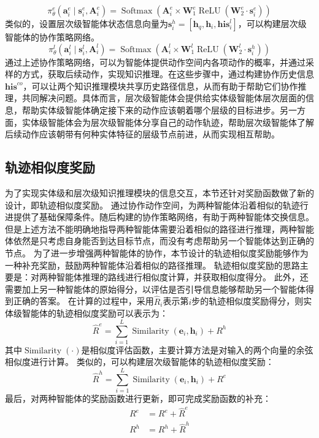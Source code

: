 \documentclass[algorithmlist, AutoFakeBold, AutoFakeSlant, figurelist, tablelist, nomlist, engineering]{seuthesix}
\begin{document}
\begin{equation}
  \pi_\theta^e\left(\bm{a}_i^e \mid \bm{s}_i^e, \bm{A}_i^e\right) =\operatorname{Softmax}\left(\bm{A}_i^e \times \mathbf{W}_1^e \operatorname{ReLU}\left(\mathbf{W}_2^e \cdot \bm{s}_i^{e}\right)\right)
  \label{pi_1}
\end{equation}
类似的，设置层次级智能体状态信息向量为$\bm{s}_i^{h} = \left[\bm{h}_q, \bm{h}_i, \bm{his}_i^l\right]$，可以构建层次级智能体的协作策略网络。
\begin{equation}
  \pi_\theta^l\left(\bm{a}_i^l \mid \bm{s}_i^l, \bm{A}_i^l\right) =\operatorname{Softmax}\left(\bm{A}_i^l \times \mathbf{W}_1^l \operatorname{ReLU}\left(\mathbf{W}_2^l \cdot \bm{s}_i^{h}\right)\right)
  \label{pi_2}
\end{equation}
通过上述协作策略网络，可以为智能体提供动作空间内各项动作的概率，并通过采样的方式，获取后续动作，实现知识推理。在这些步骤中，通过构建协作历史信息$\bm{his}^{co}$，可以让两个知识推理模块共享历史路径信息，从而有助于帮助它们协作推理，共同解决问题。具体而言，层次级智能体会提供给实体级智能体层次层面的信息，帮助实体级智能体确定接下来的动作应该朝着哪个层级的目标进步。另一方面，实体级智能体会为层次级智能体分享自己的动作轨迹，帮助层次级智能体了解后续动作应该朝带有何种实体特征的层级节点前进，从而实现相互帮助。

\subsection{轨迹相似度奖励}
为了实现实体级和层次级知识推理模块的信息交互，本节还针对奖励函数做了新的设计，即轨迹相似度奖励。
通过协作动作空间，为两种智能体沿着相似的轨迹行进提供了基础保障条件。随后构建的协作策略网络，有助于两种智能体交换信息。
但是上述方法不能明确地指导两种智能体需要沿着相似的路径进行推理，两种智能体依然是只考虑自身能否到达目标节点，而没有考虑帮助另一个智能体达到正确的节点。
为了进一步增强两种智能体的协作，本节设计的轨迹相似度奖励能够作为一种补充奖励，鼓励两种智能体沿着相似的路径推理。
轨迹相似度奖励的思路主要是：对两种智能体推理的路线进行相似度计算，并获取相似度得分。
此外，还需要加上另一种智能体的原始得分，以评估是否引导信息能够帮助另一个智能体得到正确的答案。
在计算的过程中，采用$\hat{R}_i$表示第$i$步的轨迹相似度奖励得分，则实体级智能体的轨迹相似度奖励可以表示为：
\begin{equation}
  \hat{R}^e = \sum_{i=1}^{L} \operatorname{Similarity}(\bm{e}_i, \bm{h}_i) + R^h
  \label{similar_1}
\end{equation}
其中$\operatorname{Similarity}(\cdot)$是相似度评估函数，主要计算方法是对输入的两个向量的余弦相似度进行计算。
类似的，可以构建层次级智能体的轨迹相似度奖励：
\begin{equation}
  \hat{R}^h = \sum_{i=1}^{L} \operatorname{Similarity}(\bm{e}_i, \bm{h}_i) + R^e
  \label{similar_2}
\end{equation}
最后，对两种智能体的奖励函数进行更新，即可完成奖励函数的补充：
\begin{equation}
  \begin{aligned}
    R^e &= R^e + \hat{R}^e \\
    R^h &= R^h + \hat{R}^h
  \end{aligned}
  \label{similar_reward}
\end{equation}
\end{document}
